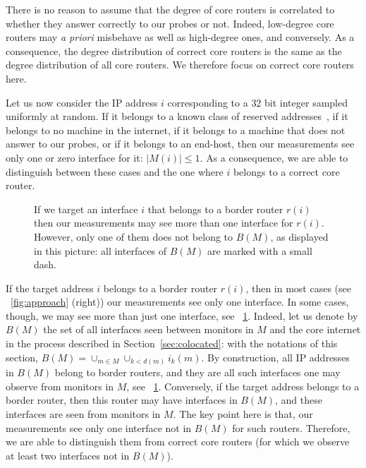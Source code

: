 \documentclass[conference]{IEEEtran}
\begin{document}
There is no reason to assume that the degree of core routers is correlated to whether they answer correctly to our probes or not. Indeed, low-degree core routers may {\em a priori} misbehave as well as high-degree ones, and conversely. As a consequence, the degree distribution of correct core routers is the same as the degree distribution of all core routers. We therefore focus on correct core routers here.

Let us now consider the IP address $i$ corresponding to a 32 bit integer sampled uniformly at random. If it belongs to a known class of reserved addresses~\cite{rfc1466}, if it belongs to no machine in the internet, if it belongs to a machine that does not answer to our probes, or if it belongs to an end-host, then our measurements see only one or zero interface for it: $|M(i)| \le 1$. As a consequence, we are able to distinguish between these cases and the one where $i$ belongs to a correct core router.

\begin{figure} \centering
\resizebox{.6\columnwidth}{!}{}
\caption{If we target an interface $i$ that belongs to a border router $r(i)$ then our measurements may see more than one interface for $r(i)$. However, only one of them does not belong to $B(M)$, as displayed in this picture: all interfaces of $B(M)$ are marked with a small dash.
}
\label{fig:targets}
\end{figure}

If the target address $i$ belongs to a border router $r(i)$, then in most cases (see \figurename~\ref{fig:approach} (right)) our measurements see only one interface. In some cases, though, we may see more than just one interface, see \figurename~\ref{fig:targets}. Indeed, let us denote by $B(M)$ the set of all interfaces seen between monitors in $M$ and the core internet in the process described in Section~\ref{sec:colocated}: with the notations of this section, $B(M) = \cup_{m\in M}\cup_{k<d(m)} i_k(m)$. By construction, all IP addresses in $B(M)$ belong to border routers, and they are all such interfaces one may observe from monitors in $M$, see \figurename~\ref{fig:targets}. Conversely, if the target address belongs to a border router, then this router may have interfaces in $B(M)$, and these interfaces are seen from monitors in $M$. The key point here is that, our measurements see only one interface not in $B(M)$ for such routers. Therefore, we are able to distinguish them from correct core routers (for which we observe at least two interfaces not in $B(M)$).
\end{document}
